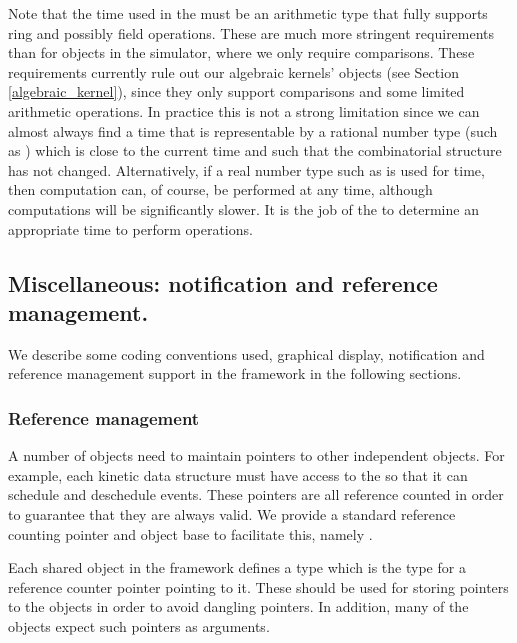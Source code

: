 Note that the time used in the  must
be an arithmetic type that fully supports ring and possibly field
operations.  These are much more stringent requirements than for
 objects in the simulator, where we only require
comparisons. These requirements currently rule out our algebraic
kernels'  objects (see Section \ref{algebraic_kernel}),
since they only support comparisons and some limited arithmetic
operations. In practice this is not a strong limitation since we can
almost always find a time that is representable by a rational number
type (such as ) which is close to the current time and such
that the combinatorial structure has not changed. Alternatively, if a
real number type such as  is used for time, then
computation can, of course, be performed at any time, although
computations will be significantly slower.  It is the job of the
 to determine an appropriate time to perform
operations.


\subsection{Miscellaneous: notification and reference management.}
\label{sec:misc}

We describe some coding conventions used, graphical display,
notification and reference management support in the framework in the
following sections.


\subsubsection{Reference management}

A number of objects need to maintain pointers to other independent
objects. For example, each kinetic data structure must have access to
the  so that it can schedule and deschedule
events. These pointers are all reference counted in order to guarantee
that they are always valid. We provide a standard reference counting
pointer and object base to facilitate this, namely
.

Each shared object in the framework defines a type  which is the
type for a reference counter pointer pointing to it. These should be
used for storing pointers to the objects in order to avoid dangling
pointers. In addition, many of the objects expect such pointers as
arguments.

